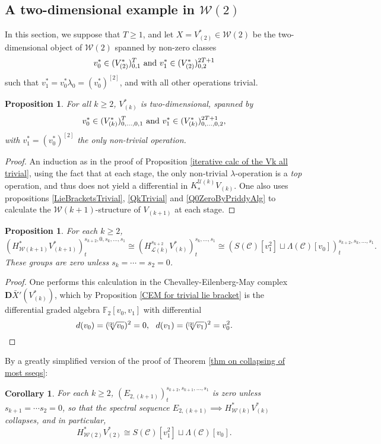 \documentclass[11pt]{amsart} \renewcommand{\baselinestretch}{1.4}
\theoremstyle{plain}
\newtheorem{prop}[thm]{Proposition}
\newtheorem{cor}[thm]{Corollary}
\theoremstyle{definition}
\newcommand{\scrC}{\mathscr{C}}
\newcommand{\calU}{\mathcal{U}}
\newcommand{\calL}{\mathcal{L}}
\newcommand{\calw}{\mathcal{W}}
\newcommand{\CommOperad}{{\scrC}}
\newcommand{\restn}[1]{#1^{[2]}}
\newcommand{\dualrestn}[1]{\sqrt[{[2]}]{#1}}
\renewcommand{\dualrestn}[1]{\sqrt[{\!\!\![2]}]{#1}}
\newcommand{\UEAX}{\bar{X}'}%
\newcommand{\F}{\mathbb{F}}
\newcommand{\Ftwo}{\F_2}
\newcommand{\dual}{\mathbf{D}}
\begin{document}
\begin{Calculations of HWn for n nonzero}
\subsection{A two-dimensional example in $\calw(2)$}
In this section, we suppose that $T\geq1$, and let $X=V^*_{(2)}\in\calw(2)$ be the two-dimensional object of $\calw(2)$ spanned by non-zero classes 
\[v_{0}^{*}\in (V^*_{(2)})^{T}_{0,1}\textup{ and }v_{1}^{*}\in (V^*_{(2)})^{2T+1}_{0,2}\]
such that $v^*_{1}=v^*_0\lambda_{0}=\restn{(v^*_0)}$, and with all other operations trivial. 
\begin{prop}
\label{2d example in w2}
For all $k\geq2$, $V^*_{(k)}$ is two-dimensional, spanned by
\[v_{0}^{*}\in (V^*_{(k)})^{T}_{0,\ldots,0,1}\textup{ and }v_{1}^{*}\in (V^*_{(k)})^{2T+1}_{0,\ldots,0,2},\]
with  $v^*_{1}=\restn{(v^*_0)}$ the only non-trivial operation.
\end{prop}
\begin{proof}
An induction as in the proof of Proposition \ref{iterative calc of the Vk all trivial}, using the fact that at each stage, the only non-trivial $\lambda$-operation is a \emph{top} operation, and thus does not yield a differential in $K_*^{\calU(k)}V_{(k)}$. One also uses propositions \ref{LieBracketsTrivial}, \ref{QkTrivial} and \ref{Q0ZeroByPriddyAlg} to calculate the $\calw(k+1)$-structure of $V_{(k+1)}$ at each stage.
\end{proof}
\begin{prop}
For each $k\geq2$,
\[(H^*_{\calw(k+1)}V^*_{(k+1)})^{s_{k+2},0,s_k,\ldots,s_1}_{t}\cong (H^{s_{k+2}}_{\calL(k)}V^*_{(k)})^{s_k,\ldots,s_1}_t\cong (S(\CommOperad)[v_1^{2}]\sqcup \Lambda(\CommOperad)[v_0])_t^{s_{k+2},s_{k},\ldots,s_1}.\]
These groups are zero unless $s_k=\cdots =s_2=0$.
\end{prop}
\begin{proof}
One performs this calculation in the Chevalley-Eilenberg-May complex $\dual\UEAX(V^*_{(k)})$, which by Proposition \ref{CEM for trivial lie bracket} is the differential graded algebra $\Ftwo [v_0,v_1]$ with differential
\[d(v_0)=(\dualrestn{v_0})^2=0,\ \ d(v_1)=(\dualrestn{v_1})^2=v_0^2.\qedhere\]
\end{proof}
By a greatly simplified version of the proof of Theorem \ref{thm on collapsing of most sseqs}:
\begin{cor}
\label{statement of result on 2d w2 example}
For each $k\geq2$, $(E_{2,(k+1)})^{s_{k+2},s_{k+1},\ldots,s_1}_{t}$ is zero unless $s_{k+1}=\cdots s_2=0$, so that the spectral sequence $E_{2,(k+1)}\implies H^*_{\calw(k)}V^*_{(k)}$ collapses, and in particular,
\[H^*_{\calw(2)}V^*_{(2)}\cong S(\CommOperad) [v_1^{2}]\sqcup \Lambda(\CommOperad)[v_0].\]
\end{cor}


\end{Calculations of HWn for n nonzero}
\end{document}
